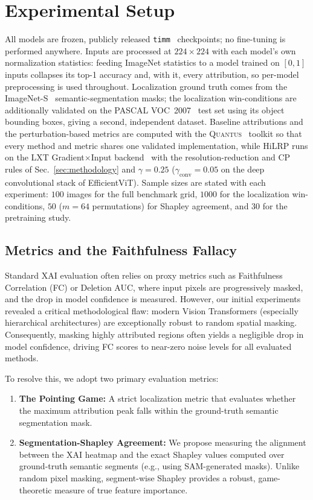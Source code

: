 \documentclass[lettersize,journal]{IEEEtran}
\begin{document}
\section{Experimental Setup}
\label{sec:setup}
All models are frozen, publicly released \texttt{timm}~\cite{wightman2019timm} checkpoints; no fine-tuning is performed anywhere. Inputs are processed at $224{\times}224$ with each model's own normalization statistics: feeding ImageNet statistics to a model trained on $[0,1]$ inputs collapses its top-1 accuracy and, with it, every attribution, so per-model preprocessing is used throughout. Localization ground truth comes from the ImageNet-S~\cite{gao2022imagenets} semantic-segmentation masks; the localization win-conditions are additionally validated on the PASCAL VOC~2007~\cite{everingham2010voc} test set using its object bounding boxes, giving a second, independent dataset. Baseline attributions and the perturbation-based metrics are computed with the \textsc{Quantus}~\cite{hedstrom2023quantus} toolkit so that every method and metric shares one validated implementation, while HiLRP runs on the LXT Gradient$\times$Input backend~\cite{achtibat2024attnlrp} with the resolution-reduction and CP rules of Sec.~\ref{sec:methodology} and $\gamma{=}0.25$ ($\gamma_{\text{conv}}{=}0.05$ on the deep convolutional stack of EfficientViT). Sample sizes are stated with each experiment: $100$ images for the full benchmark grid, $1000$ for the localization win-conditions, $50$ ($m{=}64$ permutations) for Shapley agreement, and $30$ for the pretraining study.

\subsection{Metrics and the Faithfulness Fallacy}
Standard XAI evaluation often relies on proxy metrics such as Faithfulness Correlation (FC) or Deletion AUC, where input pixels are progressively masked, and the drop in model confidence is measured. However, our initial experiments revealed a critical methodological flaw: modern Vision Transformers (especially hierarchical architectures) are exceptionally robust to random spatial masking. Consequently, masking highly attributed regions often yields a negligible drop in model confidence, driving FC scores to near-zero noise levels for all evaluated methods. 

To resolve this, we adopt two primary evaluation metrics:
\begin{enumerate}
    \item \textbf{The Pointing Game:} A strict localization metric that evaluates whether the maximum attribution peak falls within the ground-truth semantic segmentation mask.
    \item \textbf{Segmentation-Shapley Agreement:} We propose measuring the alignment between the XAI heatmap and the exact Shapley values computed over ground-truth semantic segments (e.g., using SAM-generated masks). Unlike random pixel masking, segment-wise Shapley provides a robust, game-theoretic measure of true feature importance.
\end{enumerate}
\end{document}
